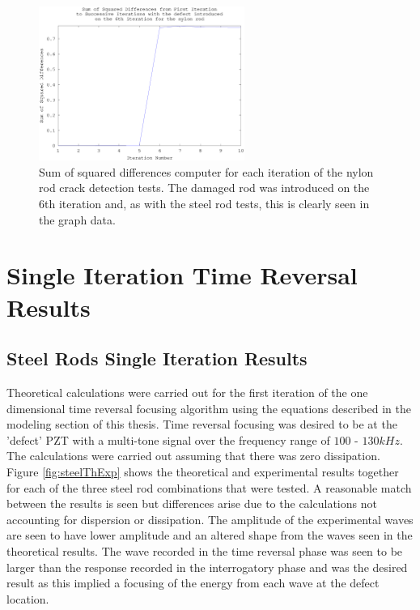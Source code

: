 \begin{figure}[ht!]
\centering
\includegraphics[width=0.6\textwidth]{eps_pics/nylonDifferences}
\caption{Sum of squared differences computer for each iteration of the nylon rod crack detection tests. The damaged rod was introduced on the 6th iteration and, as with the steel rod tests, this is clearly seen in the graph data.
 	 \label{fig:nylonDifferences}} 
\end{figure}

\section{Single Iteration Time Reversal Results}

\subsection{Steel Rods Single Iteration Results}
Theoretical calculations were carried out for the first iteration of the one dimensional time reversal focusing algorithm using the equations described in the modeling section of this thesis. Time reversal focusing was desired to be at the 'defect' PZT with a multi-tone signal over the frequency range of $100$ - $130kHz$. The calculations were carried out assuming that there was zero dissipation. Figure \ref{fig:steelThExp} shows the theoretical and experimental results together for each of the three steel rod combinations that were tested. A reasonable match between the results is seen but differences arise due to the calculations not accounting for dispersion or dissipation. The amplitude of the experimental waves are seen to have lower amplitude and an altered shape from the waves seen in the theoretical results. The wave recorded in the time reversal phase was seen to be larger than the response recorded in the interrogatory phase and was the desired result as this implied a focusing of the energy from each wave at the defect location.

